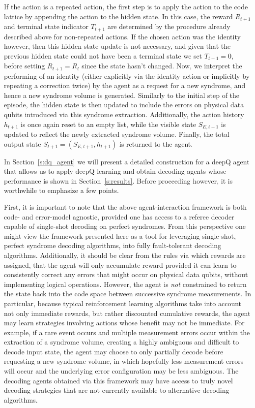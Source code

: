 \documentclass[twocolumn,preprintnumbers,amsmath,amssymb,notitlepage,nofootinbib,longbibliography,superscriptaddress,aps,pra,10pt]{revtex4-1}
\begin{document}
	If the action is a repeated action, the first step is to apply the action to the code lattice by appending the action to the hidden state.
	In this case, the reward $R_{t+1}$ and terminal state indicator $T_{t+1}$ are determined by the procedure already described above for non-repeated actions.
	If the chosen action was the identity however, then this hidden state update is not necessary, and given that the previous hidden state could not have been a terminal state we set $T_{t+1} = 0$,
	before setting $R_{t+1} = R_t$ since the state hasn't changed.
	Now, we interpret the performing of an identity (either explicitly via the identity action or implicitly by repeating a correction twice) by the agent as a request for a new syndrome,
	and hence a new syndrome volume is generated.
	Similarly to the initial step of the episode, the hidden state is then updated to include the errors on physical data qubits introduced via this syndrome extraction.
	Additionally, the action history $h_{t+1}$ is once again reset to an empty list, while the visible state $S_{E,t+1}$ is updated to reflect the newly extracted syndrome volume.
	Finally, the total output state $S_{t+1} = (S_{E,t+1},h_{t+1})$ is returned to the agent.


	In Section~\ref{s:dq_agent} we will present a detailed construction for a deepQ agent that allows us to apply deepQ-learning and obtain decoding agents whose
	performance is shown in Section~\ref{s:results}. Before proceeding however, it is worthwhile to emphasize a few points.

	First, it is important to note that the above agent-interaction framework is both code- and error-model agnostic,
	provided one has access to a referee decoder capable of single-shot decoding on perfect syndromes.
	From this perspective one might view the framework presented here as a tool for leveraging single-shot, perfect syndrome decoding algorithms,
	into fully fault-tolerant decoding algorithms.
	Additionally, it should be clear from the rules via which rewards are assigned, that the agent will only accumulate reward provided it can learn to consistently correct
	any errors that might occur on physical data qubits, without implementing logical operations.
	However, the agent is \textit{not} constrained to return the state back into the code space between successive syndrome measurements.
	In particular, because typical reinforcement learning algorithms take into account not only immediate rewards, but rather discounted cumulative rewards, the agent may learn
	strategies involving actions whose benefit may not be immediate.
	For example, if a rare event occurs and multiple measurement errors occur within the extraction of a syndrome volume, creating a highly ambiguous and difficult to decode input state,
	the agent may choose to only partially decode before requesting a new syndrome volume, in which hopefully less measurement errors will occur and the underlying error configuration may be
	less ambiguous. The decoding agents obtained via this framework may have access to truly novel decoding strategies that are not currently available to alternative decoding algorithms.
\end{document}
